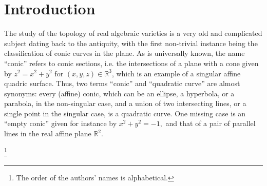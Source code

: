 \documentclass[pdflatex,sn-mathphys-num]{sn-jnl}%
\theoremstyle{thmstyleone}%
\theoremstyle{thmstyletwo}%
\theoremstyle{thmstylethree}%
\newcommand\blfootnote[1]{
    \begingroup
    \renewcommand\thefootnote{}\footnote{#1}
    \addtocounter{footnote}{-1}
    \endgroup
}
\begin{document}
\section{Introduction}

The study of the topology of real algebraic varieties is a very old and complicated subject dating back to the antiquity, with the first non-trivial instance being the classification of conic curves in the plane. As is universally known, the name “conic” refers to conic sections, i.e. the intersections of a plane with a cone given by $z^2= x^2+y^2$ for $(x,y,z)\in\mathbb{R}^3$, which is an example of a singular affine quadric surface. Thus, two terms “conic” and “quadratic curve” are almost synonyms: every (affine) conic, which can be an ellipse, a hyperbola, or a parabola, in the non-singular case, and a union of two intersecting lines, or a single point in the singular case, is a quadratic curve. One missing case is an ``empty conic'' given for instance by $x^2+y^2=-1,$ and that of a pair of parallel lines in the real affine plane $\mathbb{R}^2$. 
\blfootnote{The order of the authors' names is alphabetical.}
\end{document}

